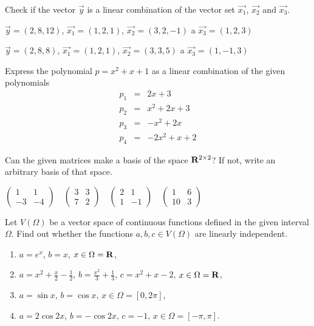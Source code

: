 \documentclass[a4paper,10pt]{book}
\def\Real{{\rm\bf R}}
\begin{document}
\exercise \label{ex:lkb2} Check if the vector $\vec{y}$ is a linear combination of the vector set $\vec{x_1}$, $\vec{x_2}$ and $\vec{x_3}$.

  \begin{enumerate*} 
    \item $\vec{y}=(2,8,12)$, $\vec{x_1}=(1,2,1)$, $\vec{x_2}=(3,2,-1)$ a $\vec{x_3}=(1,2,3)$  \\
    \item $\vec{y}=(2,8,8)$, $\vec{x_1}=(1,2,1)$, $\vec{x_2}=(3,3,5)$ a $\vec{x_3}=(1,-1,3)$  \\
  \end{enumerate*}
  
\exercise \label{ex:lkb3} Express the polynomial $p = x^2+x+1$ as a linear combination of the given polynomials
  \begin{eqnarray*}
    p_1 &=& 2x + 3 \\
    p_2 &=& x^2+2x+3 \\
    p_3 &=& -x^2+2x \\
    p_4 &=& -2x^2+x+2
  \end{eqnarray*}

\exercise \label{ex:lkb4} Can the given matrices make a basis of the space $\Real^{2\times2}$? 
If not, write an arbitrary basis of that space.
\vspace{-1em}
\begin{center}
$ \begin{pmatrix}
        1 & 1 \\ -3 & -4
  \end{pmatrix} \quad
  \begin{pmatrix}
        3 & 3 \\ 7 & 2
  \end{pmatrix} \quad
  \begin{pmatrix}
        2 & 1 \\ 1 & -1
  \end{pmatrix} \quad
  \begin{pmatrix}
        1 & 6 \\ 10 & 3
  \end{pmatrix}
$ 
\end{center}

\exercise \label{ex:lkb5} 
Let $V(\Omega)$ be a vector space of continuous functions defined in the given interval $\Omega$. 
Find out whether the functions $a,b,c\in V(\Omega)$ are linearly independent.

\begin{enumerate}[label=\alph*)]
\item $a = e^x$, $b = x$, $x \in \Omega=\Real$,
\item $a = x^2 +\frac{x}{2}-\frac{1}{2}$, $b=\frac{x^2}{3}+\frac{1}{3}$, 
      $c=x^2+x-2$, $x \in \Omega=\Real$,
\item $a = \sin x$, $b = \cos x$, $x \in \Omega=[0, 2\pi]$,
\item $a = 2\cos 2x$, $b = -\cos2x$, $c = -1$, $x \in \Omega=[-\pi, \pi]$.
\end{enumerate}
\end{document}
